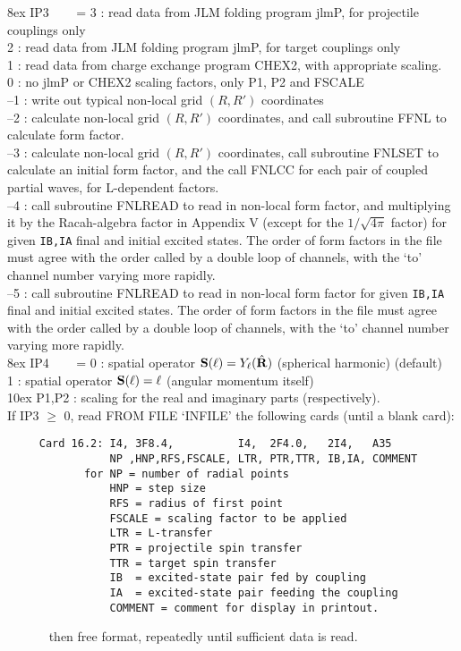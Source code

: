 \documentclass[11pt]{article}
\begin{document}
\hangindent 8ex  IP3
~~~  = 3 : read data from JLM folding program jlmP, for projectile couplings only
\\  2 : read data from JLM folding program jlmP, for target couplings only
\\   1 : read data from charge exchange program CHEX2, with appropriate scaling.
\\   0 : no jlmP or CHEX2 scaling factors, only P1, P2 and FSCALE
\\  --1 : write out typical non-local grid $(R,R')$ coordinates
\\  --2 : calculate non-local grid $(R,R')$ coordinates,
and call subroutine FFNL to calculate form factor.
\\  --3 : calculate non-local grid $(R,R')$ coordinates,
call subroutine FNLSET to calculate an initial form factor, and the call
FNLCC for each pair of coupled partial waves, for L-dependent factors.
\\ --4 : call subroutine FNLREAD to read in non-local form factor, and multiplying it by the Racah-algebra factor
in Appendix V (except for the $1/\sqrt{4\pi}$ factor) for given {\tt IB,IA} final and initial excited states. 
The order of form factors in the file must agree with the order called by a double loop of channels, with the `to' channel number varying more rapidly.
\\ --5 : call subroutine FNLREAD to read in non-local form factor for given {\tt IB,IA} final and initial excited states. 
The order of form factors in the file must agree with the order called by a double loop of channels, with the `to' channel number varying more rapidly.
\\
\hangindent 8ex IP4 
~~~  = 0 : spatial operator ${\bf S}(\ell) = Y_\ell (\hat{\bf R})$ (spherical harmonic)  (default)
\\  1 : spatial operator ${\bf S}(\ell) = {\bf \ell}$ (angular momentum itself) 
\\

\hangindent 10ex
 P1,P2 : scaling for the real and imaginary parts (respectively).\\

   If IP3 $\geq$  0, read FROM FILE `INFILE'  the following cards
   (until a blank card):
\begin{verbatim}
     Card 16.2: I4, 3F8.4,          I4,  2F4.0,   2I4,   A35
                NP ,HNP,RFS,FSCALE, LTR, PTR,TTR, IB,IA, COMMENT
            for NP = number of radial points
                HNP = step size
                RFS = radius of first point
                FSCALE = scaling factor to be applied
                LTR = L-transfer
                PTR = projectile spin transfer
                TTR = target spin transfer
                IB  = excited-state pair fed by coupling
                IA  = excited-state pair feeding the coupling
                COMMENT = comment for display in printout.
\end{verbatim}
    ~~~~~~ then free format, repeatedly until sufficient data is read.\\
\end{document}
